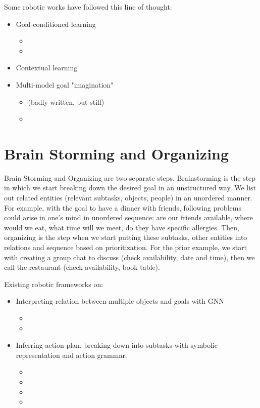 Some robotic works have followed this line of thought:
\begin{itemize}
	\item Goal-conditioned learning
	\begin{itemize}		
		\item {}
		\item {}
	\end{itemize}
	\item Contextual learning \todo{}
	\item Multi-model goal "imagination"
	\begin{itemize}
		\item {} (badly written, but still)
		\item \todo{}
	\end{itemize}
\end{itemize}

\section{Brain Storming and Organizing}
Brain Storming and Organizing are two separate steps. Brainstorming is the step in which we start breaking down the desired goal in an unstructured way. We list out related entities (relevant subtasks, objects, people) in an unordered manner. For example, with the goal to have a dinner with friends, following problems could arise in one's mind in unordered sequence: are our friends available, where would we eat, what time will we meet, do they have specific allergies. Then, organizing is the step when we start putting these subtasks, other entities into relations and sequence based on prioritization. For the prior example, we start with creating a group chat to discuss (check availability, date and time), then we call the restaurant (check availability, book table).

Existing robotic frameworks on:
\begin{itemize}
	\item Interpreting relation between multiple objects and goals with \ac{GNN}
	\begin{itemize}
		\item {}
		\item {}
	\end{itemize}
	\item Inferring action plan, breaking down into subtasks with symbolic representation and action grammar.
	\begin{itemize}
		\item {}
		\item {}
		\item {}				
		\item {}
	\end{itemize}
\end{itemize}

